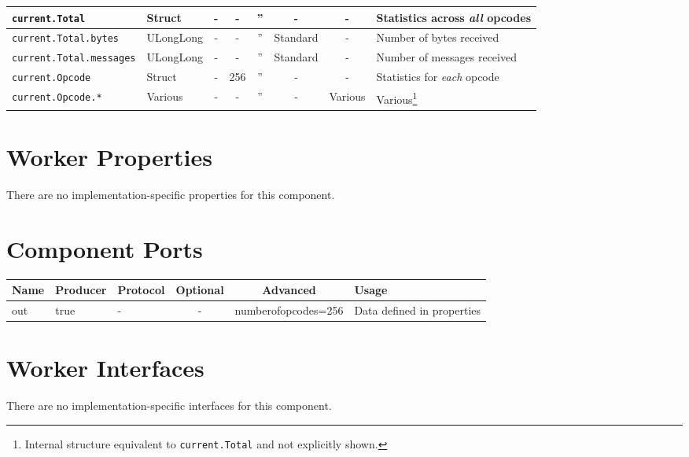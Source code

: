 \documentclass{article}
\begin{document}
\begin{landscape}
\begin{scriptsize}
\begin{minipage}{\textwidth}
\begin{tabular}{|p{3cm}|p{1.5cm}|c|c|c|c|c|p{7cm}|}
				\hline
				\verb+current.Total+ &
				Struct &
				- &
				- &
				'' &
				- &
				- &
				Statistics across \textit{all} opcodes \\
				\hline
				\verb+current.Total.bytes+ &
				ULongLong &
				- &
				- &
				'' &
				Standard &
				- &
				Number of bytes received \\
				\hline
				\verb+current.Total.messages+ &
				ULongLong &
				- &
				- &
				'' &
				Standard &
				- &
				Number of messages received \\
				\hline
				\verb+current.Opcode+ &
				Struct &
				- &
				256 &
				'' &
				- &
				- &
				Statistics for \textit{each} opcode \\
				\hline
				\verb+current.Opcode.*+ &
				Various &
				- &
				- &
				'' &
				- &
				Various &
				Various\footnote{Internal structure equivalent to \texttt{current.Total} and not explicitly shown.} \\
				\hline
			\end{tabular}
		\end{minipage}
	\end{scriptsize}
	\section*{Worker Properties}
	There are no implementation-specific properties for this component.

	\section*{Component Ports}
	\begin{scriptsize}
		\begin{tabular}{|M{2cm}|M{1.5cm}|M{4cm}|c|c|M{9cm}|}
			\hline
			Name & Producer & Protocol & Optional & Advanced            & Usage                      \\
			\hline
			out  & true     & -        & -        & numberofopcodes=256 & Data defined in properties \\
			\hline
		\end{tabular}
	\end{scriptsize}

	\section*{Worker Interfaces}
	There are no implementation-specific interfaces for this component.

\end{landscape}
\iffalse
\end{document}
